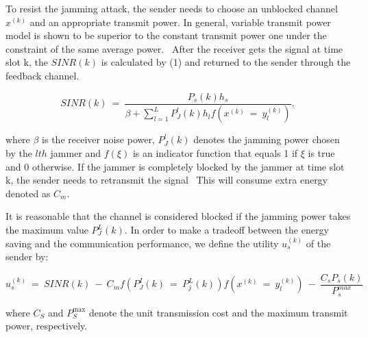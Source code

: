 \documentclass[letterpaper%
, twoside%
, 12pt%
,thesepararticles%
, english%
,creativecommons,hyperref, withAlgo2e%
]{thETS}
\begin{document}
To resist the jamming attack, the sender needs to choose an unblocked channel $\displaystyle x^{( k)}$ and an appropriate transmit power. In general, variable transmit power model is shown to be superior to the constant transmit power one under the constraint of the same average power. \ After the receiver gets the signal at time slot k, the $\displaystyle SINR( k)$ is calculated by (1) and returned to the sender through the feedback channel. 

\begin{equation}
SINR( k) \ =\ \frac{P_{s}( k) h_{s}}{\beta +\sum ^{L}_{l=1} P^{l}_{J}( k) h_{l} f\left( x^{( k)} \ =\ y^{( k)}_{l}\right)},
\end{equation}

 where $\displaystyle \beta $ is the receiver noise power, $\displaystyle P^{l}_{J}( k)$ denotes the jamming power chosen by the $\displaystyle lth$ jammer and $\displaystyle f( \xi )$ is an indicator function that equals 1 if $\displaystyle \xi $ is true and 0 otherwise. If the jammer is completely blocked by the jammer at time slot k, the sender needs to retransmit the signal \ This will consume extra energy denoted as $\displaystyle C_{m} .$

It is reasonable that the channel is considered blocked if the jamming power takes the maximum value $\displaystyle P^{L}_{J}( k) .$ In order to make a tradeoff between the energy saving and the communication performance, we define the utility $\displaystyle u^{( k)}_{s}$ of the sender by: 

\begin{equation}
u^{( k)}_{s} \ =\ SINR( k) \ -\ C_{m} f\left( P^{I}_{J}( k) \ =\ P^{L}_{j}( k)\right) f\left( x^{( k)} \ =\ y^{( k)}_{l}\right) \ -\ \frac{C_{s} P_{s}( k)}{P^{max}_{s}}
\end{equation}

where $\displaystyle C_{S}$ and $\displaystyle P^{\max}_{S}$ denote the unit transmission cost and the maximum transmit power, respectively. 
\end{document}
